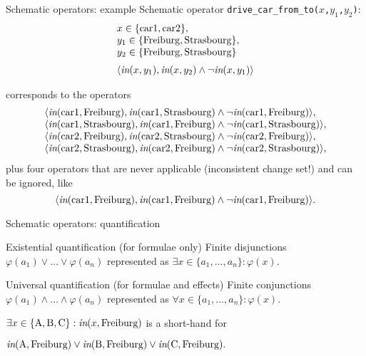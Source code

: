 \documentclass{gkibeamer}
\begin{document}
\begin{frame}{Schematic operators: example}
  Schematic operator \texttt{drive\_car\_from\_to($x$,$y_1$,$y_2$)}:
  \[
    \begin{array}{l}
      x \in \{ \text{car1},\text{car2}\}, \\
      y_1 \in \{ \text{Freiburg}, \text{Strasbourg}\}, \\
      y_2 \in \{ \text{Freiburg}, \text{Strasbourg}\}\\[\medskipamount]
      \langle \textit{in}(x, y_1), \textit{in}(x, y_2) \land
      \neg \textit{in}(x, y_1)\rangle
    \end{array}
  \]

  corresponds to the operators
  \[
    \begin{array}{l}
      \langle \textit{in}(\text{car1}, \text{Freiburg}),
      \textit{in}(\text{car1},\text{Strasbourg}) \land
      \neg \textit{in}(\text{car1}, \text{Freiburg})\rangle, \\
      \langle \textit{in}(\text{car1}, \text{Strasbourg}),
      \textit{in}(\text{car1}, \text{Freiburg}) \land
      \neg \textit{in}(\text{car1}, \text{Strasbourg})\rangle, \\
      \langle \textit{in}(\text{car2}, \text{Freiburg}),
      \textit{in}(\text{car2}, \text{Strasbourg}) \land
      \neg \textit{in}(\text{car2}, \text{Freiburg})\rangle, \\
      \langle \textit{in}(\text{car2}, \text{Strasbourg}),
      \textit{in}(\text{car2}, \text{Freiburg}) \land
      \neg \textit{in}(\text{car2}, \text{Strasbourg})\rangle,
    \end{array}
  \]
  plus four operators that are never applicable (inconsistent change set!)
  and can be ignored, like
  \[
  \langle \textit{in}(\text{car1}, \text{Freiburg}),
  \textit{in}(\text{car1},\text{Freiburg}) \land
  \neg \textit{in}(\text{car1}, \text{Freiburg})\rangle.
  \]
\end{frame}

\begin{frame}{Schematic operators: quantification}

\begin{block}{Existential quantification (for formulae only)}
Finite disjunctions $\varphi(a_1)\lor\dots\lor\varphi(a_n)$
represented as $\exists x\in\{a_1,\dots,a_n\}:\varphi(x)$.
\end{block}

\begin{block}{Universal quantification (for formulae and effects)}
  Finite conjunctions $\varphi(a_1)\land\dots\land\varphi(a_n)$
  represented as $\forall x\in\{a_1,\dots,a_n\}:\varphi(x)$.
\end{block}

\begin{example}
$\exists x\in\{\text{A},\text{B},\text{C}\}: \textit{in}(x,\text{Freiburg})$
is a short-hand for

$\textit{in}(\text{A},\text{Freiburg})\lor\textit{in}(\text{B},\text{Freiburg})\lor\textit{in}(\text{C},\text{Freiburg}).$
\end{example}

\end{frame}
\end{document}
